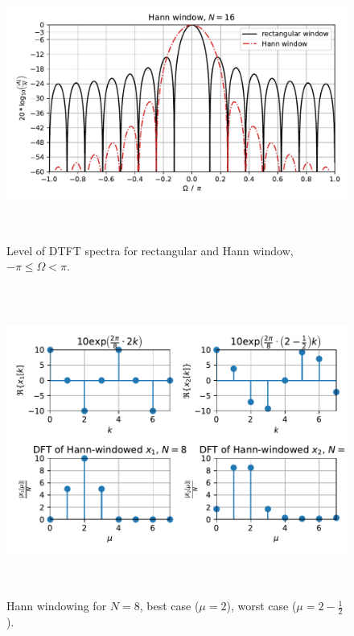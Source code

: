 \documentclass[11pt,a4paper,DIV=12]{scrartcl}
\begin{document}
\begin{figure}
		\centering
		\includegraphics[width=6in, height=3.5in]{graphics/DTFTHannWin_log.pdf}
		\caption{Level of DTFT spectra for rectangular and Hann window, $-\pi\leq\Omega<\pi$.}
		\label{DTFTHanningWin_log}
\end{figure}
\begin{figure}
		\centering
		\includegraphics[width=6in, height=4in]{graphics/DFTbestworstcase_HannWin.pdf}
		\caption{Hann windowing for $N=8$, best case ($\mu=2$), worst case ($\mu=2-\frac{1}{2}$).}
		\label{DFTbestworstcase_HannWin}
\end{figure}
\end{document}
